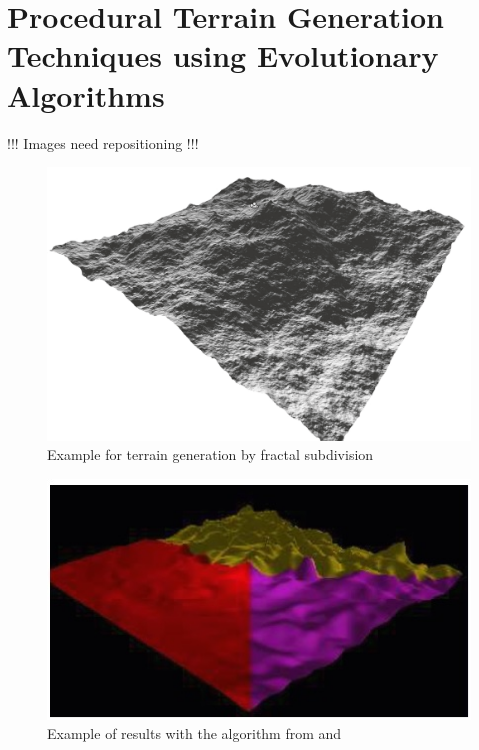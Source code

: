 \section{Procedural Terrain Generation Techniques using Evolutionary Algorithms}

!!! Images need repositioning !!!

\begin{figure}[htb]
	\centering
	\includegraphics[width=\linewidth]{RZL12/06256610_1.png}
	\caption{Example for terrain generation by fractal subdivision}
	\label{fig:frag_subdev}
\end{figure}

\begin{figure}[htb]
	\centering
	\includegraphics[width=\linewidth]{RZL12/tz76jt7ut.jpg}
	\caption{Example of results with the algorithm from \cite{ong2005terrain} and \cite{saunders2006realistic}}
	\label{fig:tag15}
\end{figure}

